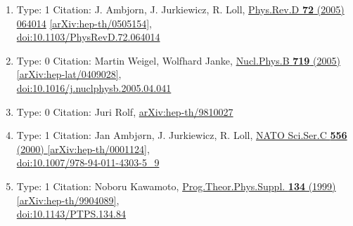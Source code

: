 \documentclass[a4paper,10pt]{article}
\begin{document}
\begin{enumerate}
\begin{enumerate}
  \item Type: 1 Citation: J. Ambjorn, J. Jurkiewicz, R. Loll, \href{https://www.doi.org/10.1103/PhysRevD.72.064014}{Phys.Rev.D {\bf 72} (2005) 064014}  \href{https://arxiv.org/abs/hep-th/0505154}{[arXiv:hep-th/0505154]},\\\href{https://www.doi.org/10.1103/PhysRevD.72.064014}{doi:10.1103/PhysRevD.72.064014}
  \item Type: 0 Citation: Martin Weigel, Wolfhard Janke, \href{https://www.doi.org/10.1016/j.nuclphysb.2005.04.041}{Nucl.Phys.B {\bf 719} (2005) }  \href{https://arxiv.org/abs/hep-lat/0409028}{[arXiv:hep-lat/0409028]},\\\href{https://www.doi.org/10.1016/j.nuclphysb.2005.04.041}{doi:10.1016/j.nuclphysb.2005.04.041}
  \item Type: 0 Citation: Juri Rolf, \href{https://arxiv.org/abs/hep-th/9810027}{arXiv:hep-th/9810027}
  \item Type: 1 Citation: Jan Ambjørn, J. Jurkiewicz, R. Loll, \href{https://www.doi.org/10.1007/978-94-011-4303-5_9}{NATO Sci.Ser.C {\bf 556} (2000) }  \href{https://arxiv.org/abs/hep-th/0001124}{[arXiv:hep-th/0001124]},\\\href{https://www.doi.org/10.1007/978-94-011-4303-5_9}{doi:10.1007/978-94-011-4303-5\_9}
  \item Type: 1 Citation: Noboru Kawamoto, \href{https://www.doi.org/10.1143/PTPS.134.84}{Prog.Theor.Phys.Suppl. {\bf 134} (1999) }  \href{https://arxiv.org/abs/hep-th/9904089}{[arXiv:hep-th/9904089]},\\\href{https://www.doi.org/10.1143/PTPS.134.84}{doi:10.1143/PTPS.134.84}

\end{enumerate}
\end{enumerate}
\end{document}
